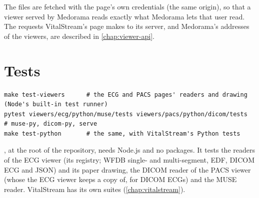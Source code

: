 The files are fetched with the page's own credentials (the same origin), so that a viewer served
by Medorama reads exactly what Medorama lets that user read. The requests VitalStream's page
makes to its server, and Medorama's addresses of the viewers, are described in
\cref{chap:viewer-api}.

\section{Tests}
\label{sec:viewers-alone-tests}

\begin{lstlisting}[style=shell]
make test-viewers      # the ECG and PACS pages' readers and drawing (Node's built-in test runner)
pytest viewers/ecg/python/muse/tests viewers/pacs/python/dicom/tests    # muse-py, dicom-py, serve
make test-python       # the same, with VitalStream's Python tests
\end{lstlisting}

, at the root of the repository, needs Node.js and no packages. It tests
the readers of the ECG viewer (its registry; WFDB single- and multi-segment, EDF, DICOM ECG and
JSON) and its paper drawing,
the DICOM reader of the PACS viewer (whose  the ECG viewer keeps a copy of, for
DICOM ECGs) and the MUSE reader. VitalStream has its own suites (\cref{chap:vitalstream}).
